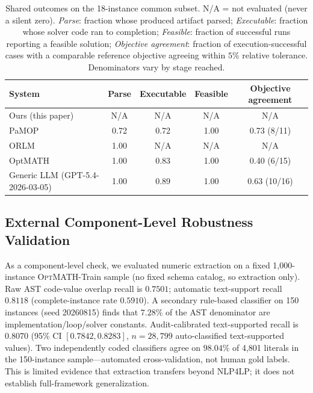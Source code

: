 \documentclass[pdflatex,sn-basic,Numbered]{sn-jnl}
\begin{document}
\begin{table}[t]
  \centering
  \caption{Shared outcomes on the 18-instance common subset. N/A = not evaluated (never a silent zero). \textit{Parse}: fraction whose produced artifact parsed; \textit{Executable}: fraction whose solver code ran to completion; \textit{Feasible}: fraction of successful runs reporting a feasible solution; \textit{Objective agreement}: fraction of execution-successful cases with a comparable reference objective agreeing within $5\%$ relative tolerance. Denominators vary by stage reached.}
  \label{tab:ext-outcomes}
  \small
  \setlength{\tabcolsep}{4pt}
  \begin{tabular}{lcccc}
    \toprule
    System & Parse & Executable & Feasible & Objective agreement \\
    \midrule
    Ours (this paper) & N/A & N/A & N/A & N/A \\
    PaMOP \cite{pan2025pamop} & 0.72 & 0.72 & 1.00 & 0.73 (8/11) \\
    ORLM \cite{huang2025orlm} & 1.00 & N/A & N/A & N/A \\
    OptMATH \cite{lu2025optmath} & 1.00 & 0.83 & 1.00 & 0.40 (6/15) \\
    Generic LLM (GPT-5.4-2026-03-05) & 1.00 & 0.89 & 1.00 & 0.63 (10/16) \\
    \bottomrule
  \end{tabular}
\end{table}

\subsection{External Component-Level Robustness Validation}
\label{subsec:exp_external_validation}

As a component-level check, we evaluated numeric extraction on a fixed 1,000-instance \textsc{OptMATH}-Train sample \cite{lu2025optmath} (no fixed schema catalog, so extraction only). Raw AST code-value overlap recall is $0.7501$; automatic text-support recall $0.8118$ (complete-instance rate $0.5910$). A secondary rule-based classifier on 150 instances (seed 20260815) finds that $7.28\%$ of the AST denominator are implementation/loop/solver constants. Audit-calibrated text-supported recall is $0.8070$ (95\% CI $[0.7842,0.8283]$, $n=28{,}799$ auto-classified text-supported values). Two independently coded classifiers agree on $98.04\%$ of 4,801 literals in the 150-instance sample---automated cross-validation, not human gold labels. This is limited evidence that extraction transfers beyond \textsc{NLP4LP}; it does not establish full-framework generalization.
\end{document}
